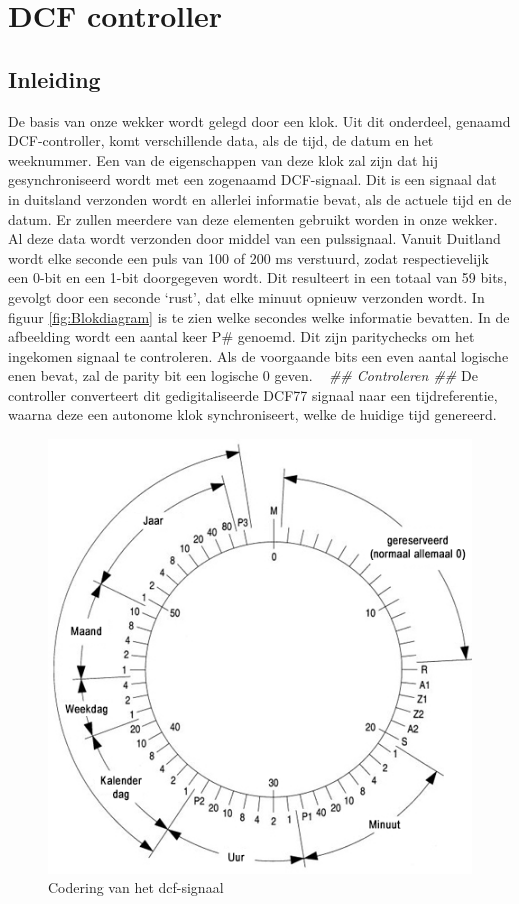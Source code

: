 \chapter{DCF controller}
\section{Inleiding}
De basis van onze wekker wordt gelegd door een klok. Uit dit onderdeel, genaamd DCF-controller,  komt verschillende data, als de tijd, de datum en het weeknummer. Een van de eigenschappen van deze klok zal zijn dat hij gesynchroniseerd wordt met een zogenaamd DCF-signaal. Dit is een signaal dat in duitsland verzonden wordt en allerlei informatie bevat, als de actuele tijd en de datum. Er zullen meerdere van deze elementen gebruikt worden in onze wekker.  Al deze data wordt verzonden door middel van een pulssignaal. Vanuit Duitland wordt elke seconde een puls van 100 of 200 ms verstuurd, zodat respectievelijk een 0-bit en een 1-bit doorgegeven wordt. Dit resulteert in een totaal van 59 bits, gevolgt door een seconde ‘rust’, dat elke minuut opnieuw verzonden wordt. In figuur \ref{fig:Blokdiagram} is te zien welke secondes welke informatie bevatten. In de afbeelding wordt een aantal keer P\# genoemd. Dit zijn paritychecks om het ingekomen signaal te controleren. Als de voorgaande bits een even aantal logische enen bevat, zal de parity bit een logische 0 geven. ~\cite{Tijdscodering} \emph{\color{red} \#\# Controleren \#\#} De controller converteert dit gedigitaliseerde DCF77 signaal naar een tijdreferentie, waarna deze een autonome klok synchroniseert, welke de huidige tijd genereerd.

\begin{figure}[h!]
\center
\includegraphics[scale=2]{Figuren/DCF77/dcf77coding.png}
\caption{Codering van het dcf-signaal~\cite{Tijdscodering}}
\label{fig:dcfsignaal}
\end{figure}

